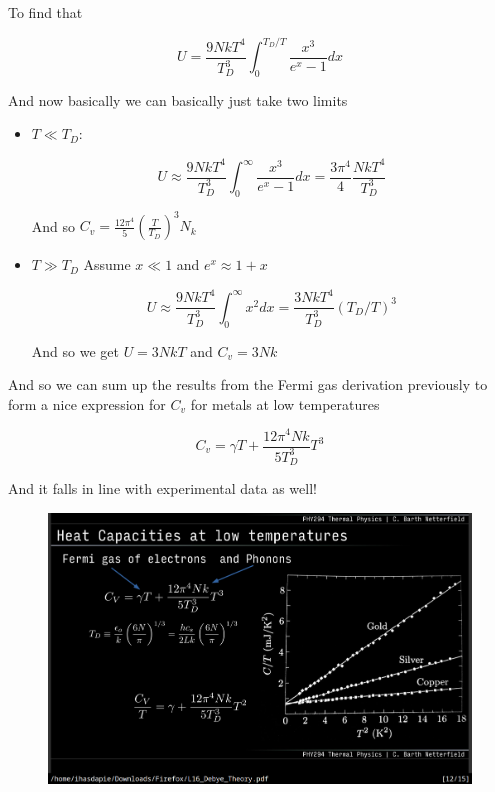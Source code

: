 \documentclass[10pt]{article}
\begin{document}
To find that

\begin{equation}
	U = \frac{9NkT^4}{T_D^3} \int_0^{T_D /T} \frac{x^3}{e^x - 1} dx
\end{equation}

And now basically we can basically just take two limits

\begin{itemize}
	\item $ T \ll T_D $:

\begin{equation}
	U \approx  \frac{9NkT^4}{T_D^3} \int_0^{\infty} \frac{x^3}{e^x - 1} dx
	= \frac{3\pi^4}{4} \frac{NkT^4}{T_D^3}
\end{equation}

And so $ C_v = \frac{12\pi^4}{5} (\frac{T}{T_D})^3 N_k $ 


\item $ T \gg T_D $
Assume $ x \ll 1 $ and $ e^x \approx 1 + x $ 


\begin{equation}
	U \approx  \frac{9NkT^4}{T_D^3} \int_0^{\infty} x^2 dx
	= \frac{3NkT^4}{T^3_D} (T_D/T)^3
\end{equation}

And so we get $ U = 3NkT $   and $ C_v = 3Nk $ 

\end{itemize}


And so we can sum up the results from the Fermi gas derivation previously to form a nice expression for $ C_v  $ for metals at low temperatures 

\begin{equation}
	C_v = \gamma T + \frac{12\pi^4 Nk}{5T^3_D} T^3
\end{equation}

And it falls in line with experimental data as well!

\begin{figure}[H]
	\centering
	\includegraphics[width=0.8\linewidth]{img/image_2022-04-08-14-20-57.png}
\end{figure}
\end{document}
